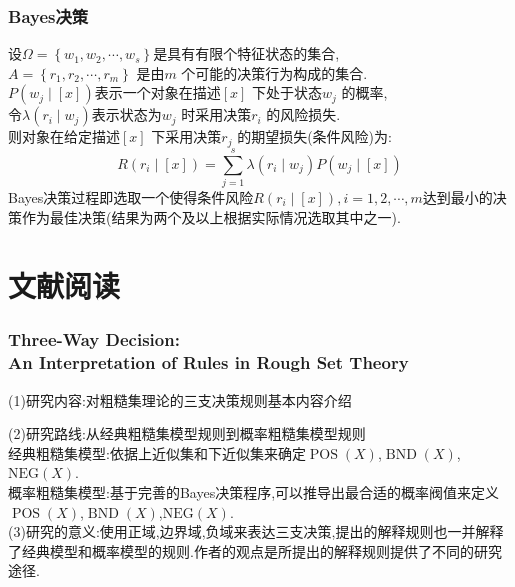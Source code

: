 \documentclass[aspectratio=169]{beamer}
\begin{document}
\begin{frame}[t]
  \frametitle{Bayes决策}
  \vspace{0.3cm}
  设$\Omega=\left\{w_{1}, w_{2}, \cdots, w_{s}\right\}$是具有有限个特征状态的集合,\\$A=\left\{r_{1}, r_{2}, \cdots, r_{m}\right\}$
  是由$m$ 个可能的决策行为构成的集合.\\$P\left(w_{j} \mid[x]\right)$表示一个对象在描述$[x]$ 下处于状态$w_{j}$ 的概率,\\
  令$\lambda\left(r_{i} \mid w_{j}\right)$表示状态为$w_{j}$ 时采用决策$r_{i}$ 的风险损失.\\
  则对象在给定描述$[x]$ 下采用决策$r_{j}$ 的期望损失(条件风险)为:
  $$R\left(r_{i} \mid[x]\right)=\sum_{j=1}^{s} \lambda\left(r_{i}
  \mid w_{j}\right) P\left(w_{j} \mid[x]\right)$$
  Bayes决策过程即选取一个使得条件风险$R\left(r_{i} \mid[x]\right), i=1,2, \cdots, m$达到最小的决策作为最佳决策(结果为两个及以上根据实际情况选取其中之一).

\end{frame}

\section{文献阅读}

\frame{\tableofcontents[currentsection]}


\begin{frame}[t]
  \frametitle{Three-Way Decision:\\An Interpretation of Rules in Rough Set Theory}
  \vspace{0.3cm}
  (1)研究内容:对粗糙集理论的三支决策规则基本内容介绍\\
  \vspace{0.2cm}

  (2)研究路线:从经典粗糙集模型规则到概率粗糙集模型规则\\
  \vspace{0.2cm}
  经典粗糙集模型:依据上近似集和下近似集来确定$\operatorname{POS}(X)$,$\operatorname{BND}(X)$,$\mathrm{NEG}(X)$.\\
  \vspace{0.2cm}
  概率粗糙集模型:基于完善的Bayes决策程序,可以推导出最合适的概率阀值来定义$\operatorname{POS}(X)$,$\operatorname{BND}(X)$,$\mathrm{NEG}(X)$.\\
  \vspace{0.2cm}
  (3)研究的意义:使用正域,边界域,负域来表达三支决策,提出的解释规则也一并解释了经典模型和概率模型的规则.作者的观点是所提出的解释规则提供了不同的研究途径.
\end{frame}
\end{document}
